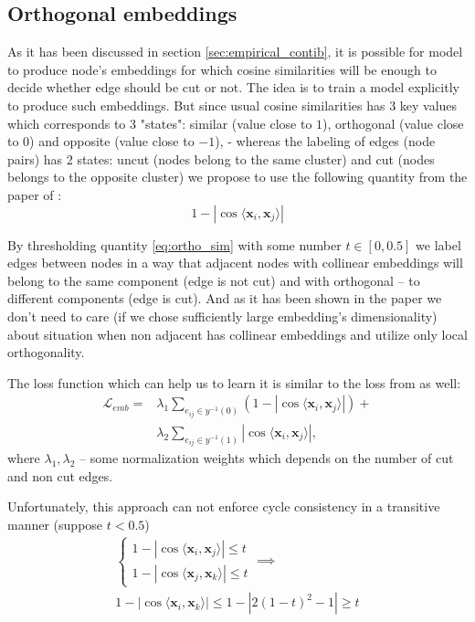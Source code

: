 \documentclass[10pt, twocolumn, a4paper]{article}
\theoremstyle{definition}
\begin{document}
\subsection{Orthogonal embeddings} \label{sec:ortho_emb}
As it has been discussed in section \ref{sec:empirical_contib}, it is possible for model
to produce node's embeddings for which cosine similarities will be enough to decide whether
edge should be cut or not. The idea is to train a model explicitly to produce such embeddings.
But since usual cosine similarities has 3 key values which corresponds to 3 "states":
similar (value close to $1$), orthogonal (value close to $0$) and opposite (value close to $-1$), -
whereas the labeling of edges (node pairs) has 2 states: uncut (nodes belong to the same cluster) and cut
(nodes belongs to the opposite cluster) we propose to use the following quantity from the paper
of \citet{chen2019instance}:
\begin{equation} \label{eq:ortho_sim}
    1 - |\cos \langle \mathbf{x}_i, \mathbf{x}_j \rangle|
\end{equation}

By thresholding quantity \eqref{eq:ortho_sim} with some number $t \in [0, 0.5]$ we label edges between nodes
in a way that adjacent nodes with collinear embeddings will belong to the same component (edge is not cut)
and with orthogonal -- to different components (edge is cut). And as it has been shown in the
paper we don't need to care (if we chose sufficiently large embedding's dimensionality)
about situation when non adjacent has collinear embeddings and utilize only local orthogonality.

The loss function which can help us to learn it is similar to the loss from \citet{chen2019instance} as well:
\begin{align} \label{eq:ortho_loss}
    \mathcal{L}_{emb} =
     & \lambda_1 \sum\limits_{e_{ij} \in y^{-1}(0)} \left(1 - |\cos \langle \mathbf{x}_i, \mathbf{x}_j \rangle| \right) + \\
     & \lambda_2 \sum\limits_{e_{ij} \in y^{-1}(1)} |\cos \langle \mathbf{x}_i, \mathbf{x}_j \rangle|,
\end{align}
where $\lambda_1, \lambda_2$ -- some normalization weights which depends on the number of cut and non cut edges.

Unfortunately, this approach can not enforce cycle consistency in a transitive manner
(suppose $t < 0.5$)
\begin{multline*}
    \begin{cases}
        1 - |\cos \langle \mathbf{x}_i, \mathbf{x}_j \rangle| \leq t \\
        1 - |\cos \langle \mathbf{x}_j, \mathbf{x}_k \rangle| \leq t
    \end{cases} \implies \\
    1 - |\cos \langle \mathbf{x}_i, \mathbf{x}_k \rangle| \leq
    1 - |2(1 - t)^2 - 1| \geq t
\end{multline*}
\end{document}
